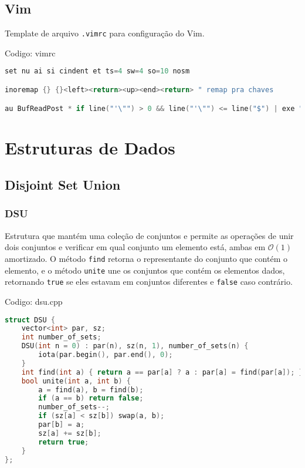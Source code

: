 \documentclass[10pt, a4paper, oneside]{book}
\begin{document}
\section{Vim}


Template de arquivo \texttt{.vimrc} para configuração do Vim.

\hfill

Codigo: vimrc

\begin{lstlisting}[language=C++]
set nu ai si cindent et ts=4 sw=4 so=10 nosm

inoremap {} {}<left><return><up><end><return> " remap pra chaves

au BufReadPost * if line("'\"") > 0 && line("'\"") <= line("$") | exe "normal! g'\"" | endif " volta pro lugar onde estava quando saiu do arquivo
\end{lstlisting}
\hfill

\newpage

%
%
%
%

\chapter{Estruturas de Dados}

\section{Disjoint Set Union}
\subsection{DSU}


Estrutura que mantém uma coleção de conjuntos e permite as operações de unir dois conjuntos e verificar em qual conjunto um elemento está, ambas em $\mathcal{O}(1)$ amortizado. O método \texttt{find} retorna o representante do conjunto que contém o elemento, e o método \texttt{unite} une os conjuntos que contém os elementos dados, retornando \texttt{true} se eles estavam em conjuntos diferentes e \texttt{false} caso contrário.

\hfill

Codigo: dsu.cpp

\begin{lstlisting}[language=C++]
struct DSU {
    vector<int> par, sz;
    int number_of_sets;
    DSU(int n = 0) : par(n), sz(n, 1), number_of_sets(n) {
        iota(par.begin(), par.end(), 0);
    }
    int find(int a) { return a == par[a] ? a : par[a] = find(par[a]); }
    bool unite(int a, int b) {
        a = find(a), b = find(b);
        if (a == b) return false;
        number_of_sets--;
        if (sz[a] < sz[b]) swap(a, b);
        par[b] = a;
        sz[a] += sz[b];
        return true;
    }
};
\end{lstlisting}
\hfill
\end{document}
